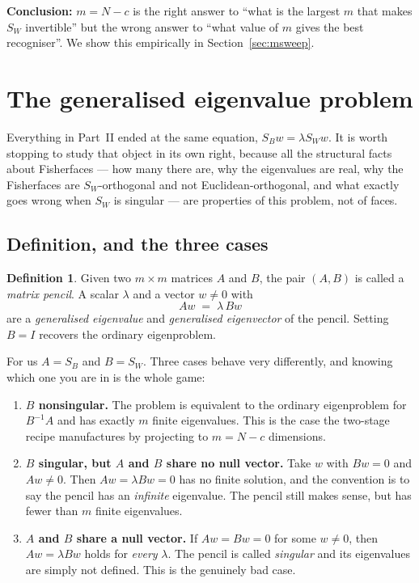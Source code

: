 \documentclass[11pt]{article}
\theoremstyle{definition}
\newtheorem{definition}[theorem]{Definition}
\theoremstyle{remark}
\newcommand{\Sw}{S_W}
\newcommand{\Sb}{S_B}
\begin{document}
\textbf{Conclusion:} $m=N-c$ is the right answer to ``what is the largest $m$ that
makes $\Sw$ invertible'' but the wrong answer to ``what value of $m$ gives the best
recogniser''. We show this empirically in Section~\ref{sec:msweep}.

\section{The generalised eigenvalue problem}
\label{sec:gevp}

Everything in Part~II ended at the same equation, $\Sb w = \lambda \Sw w$. It is
worth stopping to study that object in its own right, because all the structural
facts about Fisherfaces --- how many there are, why the eigenvalues are real, why
the Fisherfaces are $\Sw$-orthogonal and not Euclidean-orthogonal, and what
exactly goes wrong when $\Sw$ is singular --- are properties of this problem, not
of faces.

\subsection{Definition, and the three cases}

\begin{definition}
Given two $m\times m$ matrices $A$ and $B$, the pair $(A,B)$ is called a
\emph{matrix pencil}. A scalar $\lambda$ and a vector $w \neq 0$ with
\[
  A w \;=\; \lambda\, B w
\]
are a \emph{generalised eigenvalue} and \emph{generalised eigenvector} of the
pencil. Setting $B=I$ recovers the ordinary eigenproblem.
\end{definition}

For us $A=\Sb$ and $B=\Sw$. Three cases behave very differently, and knowing
which one you are in is the whole game:

\begin{enumerate}[leftmargin=*,label=(\alph*)]
\item \textbf{$B$ nonsingular.} The problem is equivalent to the ordinary
  eigenproblem for $B^{-1}A$ and has exactly $m$ finite eigenvalues. This is the
  case the two-stage recipe manufactures by projecting to $m=N-c$ dimensions.
\item \textbf{$B$ singular, but $A$ and $B$ share no null vector.} Take $w$ with
  $Bw = 0$ and $Aw \neq 0$. Then $Aw = \lambda Bw = 0$ has no finite solution, and
  the convention is to say the pencil has an \emph{infinite} eigenvalue. The
  pencil still makes sense, but has fewer than $m$ finite eigenvalues.
\item \textbf{$A$ and $B$ share a null vector.} If $Aw = Bw = 0$ for some
  $w\neq0$, then $Aw = \lambda Bw$ holds for \emph{every} $\lambda$. The pencil is
  called \emph{singular} and its eigenvalues are simply not defined. This is the
  genuinely bad case.
\end{enumerate}
\end{document}
